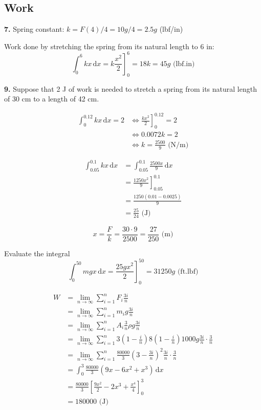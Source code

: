 \documentclass[a4paper,12pt]{article}
\newcommand{\ud}{\,\mathrm{d}}
\begin{document}
\setcounter{subsection}{3}
\subsection{Work}
\textbf{7. }Spring constant: $k = F(4) / 4 = 10g / 4 = 2.5g$ (lbf/in)

Work done by stretching the spring from its natural length to 6 in:
\[\int_0^6 kx\ud x = \left.k\frac{x^2}{2}\right]_0^6 = 18k = 45g\text{ (lbf.in)}\]

\noindent\textbf{9. }Suppose that 2 J of work is needed to stretch a spring from its
natural length of 30 cm to a length of 42 cm.

\begin{align*}
      \int_0^{0.12}kx\ud x = 2
&\iff \left.\frac{kx^2}{2}\right]_0^{0.12} = 2\\
&\iff 0.0072k = 2\\
&\iff k = \frac{2500}{9}\text{ (N/m)}
\end{align*}

\begin{align*}
  \int_{0.05}^{0.1}kx\ud x
&=\int_{0.05}^{0.1}\frac{2500x}{9}\ud x\\
&=\left.\frac{1250x^2}{9}\right]_{0.05}^{0.1}\\
&=\frac{1250(0.01 - 0.0025)}{9}\\
&=\frac{25}{24}\text{ (J)}\tag{a}
\end{align*}

\[x = \frac{F}{k} = \frac{30 \cdot 9}{2500} = \frac{27}{250}\text{ (m)}\tag{b}\]

\noindent Evaluate the integral
\[\int_0^{50}mgx\ud x = \left.\frac{25gx^2}{2}\right]_0^{50} = 31250g\text{ (ft.lbf)}\tag{13}\]

\begin{align*}
W&=\lim_{n \to \infty}\sum_{i = 1}^n F_i\frac{3i}{n}\\
 &=\lim_{n \to \infty}\sum_{i = 1}^n m_i g\frac{3i}{n}\\
 &=\lim_{n \to \infty}\sum_{i = 1}^n A_i\frac{3}{n}\rho g\frac{3i}{n}\\
 &=\lim_{n \to \infty}\sum_{i = 1}^n
   3\left(1 - \frac{i}{n}\right)8\left(1 - \frac{i}{n}\right)
   1000g\frac{3i}{n}\cdot\frac{3}{n}\\
 &=\lim_{n \to \infty}\sum_{i = 1}^n
   \frac{80000}{3}\left(3 - \frac{3i}{n}\right)^2\frac{3i}{n}\cdot\frac{3}{n}\\
 &=\int_0^3 \frac{80000}{3}\left(9x - 6x^2 + x^3\right)\ud x\\
 &=\frac{80000}{3}\left[\frac{9x^2}{2} - 2x^3 + \frac{x^4}{4}\right]_0^3\\
 &=180000\text{ (J)}\tag{21}
\end{align*}
\end{document}
